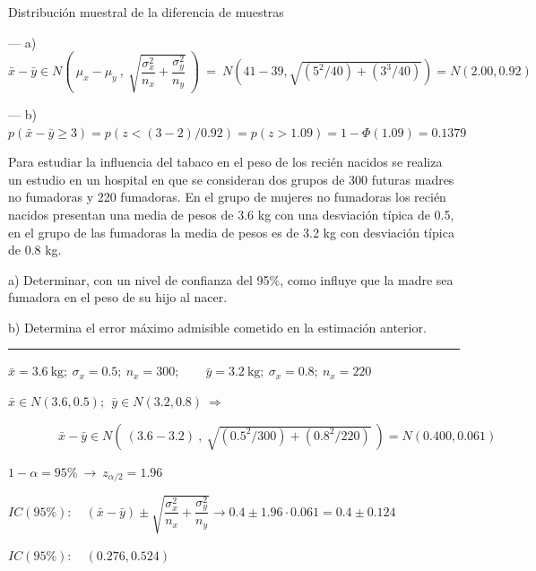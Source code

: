 \begin{myalertblock}{Distribución muestral de la diferencia de muestras}
\begin{example}
\vspace{2mm} --- a) $\bar x - \bar y \in N\left( \ \mu_x-\mu_y \ , \ \sqrt{\dfrac {\sigma_x^2}{n_x} +\dfrac {\sigma_y^2}{n_y}} \ \right) \ =\ N(41-39, \sqrt{(5^2/40)+(3^3/40)})=N(2.00,0.92)$

\vspace{2mm} --- b) $p(\bar x - \bar y \ge 3)=p(z<(3-2)/0.92)=p(z>1.09)=1-\Phi(1.09)=0.1379$

\end{example}

\begin{ejemplo}
\begin{ejre}
Para estudiar la influencia del tabaco en el peso de los recién nacidos se realiza un estudio en un hospital en que se consideran dos grupos de 300 futuras madres no fumadoras y 220 fumadoras. En el grupo de mujeres no fumadoras los recién nacidos presentan una media de pesos de 3.6 kg con una desviación típica de 0.5, en el grupo de las fumadoras la media de pesos es de 3.2 kg con desviación típica de 0.8 kg.

\vspace{2mm} a) Determinar, con un nivel de confianza del 95\%, como influye que la madre sea fumadora en el peso de su hijo al nacer.

\vspace{2mm} b) Determina el error máximo admisible cometido en la estimación anterior.

\rule{150pt}{0.1pt}

\vspace{2mm} $\bar x=3.6 \ \mathrm{kg};\ \sigma_x=0.5;\ n_x=300; \qquad 
\bar y=3.2 \ \mathrm{kg};\ \sigma_x=0.8;\ n_x=220$

\vspace{2mm} $\bar x \in N(3.6,0.5);\ \ \bar y \in N(3.2,0.8)\ \Rightarrow$ 

\vspace{2mm} $\qquad \qquad  \bar x - \bar y \in N( \ (3.6-3.2) \ , \ \sqrt{(0.5^2/300) + (0.8^2/220)} \ ) = N(0.400,0.061)$

\vspace{2mm} $1-\alpha=95\% \ \to \ z_{\alpha/2}=1.96$

\vspace{2mm} $IC(95\%):\quad (\bar x - \bar y) \pm \sqrt{\dfrac {\sigma_x^2}{n_x} +\dfrac {\sigma_y^2}{n_y}} \to 0.4 \pm 1.96 \cdot 0.061=0.4\pm 0.124 $

\vspace{2mm} $IC(95\%):\quad (0.276,0.524)$


\end{ejre}
\end{ejemplo}
\end{myalertblock}
